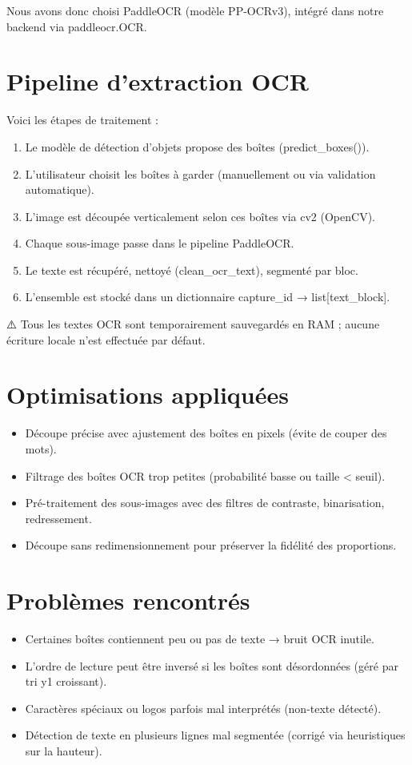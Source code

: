 \documentclass[12pt,a4paper]{report}
\begin{document}
Nous avons donc choisi PaddleOCR (modèle PP-OCRv3), intégré dans notre backend via paddleocr.OCR.

\section{Pipeline d'extraction OCR}

Voici les étapes de traitement :
\begin{enumerate}
\item Le modèle de détection d'objets propose des boîtes (predict\_boxes()).
\item L'utilisateur choisit les boîtes à garder (manuellement ou via validation automatique).
\item L'image est découpée verticalement selon ces boîtes via cv2 (OpenCV).
\item Chaque sous-image passe dans le pipeline PaddleOCR.
\item Le texte est récupéré, nettoyé (clean\_ocr\_text), segmenté par bloc.
\item L'ensemble est stocké dans un dictionnaire capture\_id → list[text\_block].
\end{enumerate}

⚠️ Tous les textes OCR sont temporairement sauvegardés en RAM ; aucune écriture locale n'est effectuée par défaut.

\section{Optimisations appliquées}

\begin{itemize}
\item Découpe précise avec ajustement des boîtes en pixels (évite de couper des mots).
\item Filtrage des boîtes OCR trop petites (probabilité basse ou taille < seuil).
\item Pré-traitement des sous-images avec des filtres de contraste, binarisation, redressement.
\item Découpe sans redimensionnement pour préserver la fidélité des proportions.
\end{itemize}

\section{Problèmes rencontrés}

\begin{itemize}
\item Certaines boîtes contiennent peu ou pas de texte → bruit OCR inutile.
\item L'ordre de lecture peut être inversé si les boîtes sont désordonnées (géré par tri y1 croissant).
\item Caractères spéciaux ou logos parfois mal interprétés (non-texte détecté).
\item Détection de texte en plusieurs lignes mal segmentée (corrigé via heuristiques sur la hauteur).
\end{itemize}
\end{document}
